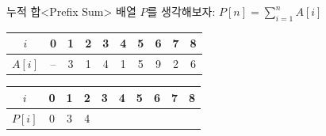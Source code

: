 \begin{frame}{누적 합}{<Prefix Sum>}
  배열 $P$를 생각해보자: $P[n] = \sum\limits_{i=1}^{n} A[i]$
  \vspace{4mm}
  \begin{center}
    \begin{tabular}{|c|c|c|c|c|c|c|c|c|c|}
      \hline
      \rowcolor{aloha-highlight}
      $i$    & 0 & 1 & 2 & 3 & 4 & 5 & 6 & 7 & 8 \\ \hline
      $A[i]$ & – & 3 & 1 & 4 & 1 & 5 & 9 & 2 & 6 \\ \hline
    \end{tabular}

    \vspace{2mm}
    \hspace{6mm}

    \vspace{2mm}
    \begin{tabular}{|c|c|c|c|c|c|c|c|c|c|}
      \hline
      \rowcolor{aloha-highlight}
      $i$    & 0 & 1 & 2 & 3 & 4 & 5 & 6 & 7 & 8 \\ \hline
      $P[i]$ & 0 & 3 & \cellcolor{aloha-accent!55}\color{white}4
             &   &   &   &   &   &   \\ \hline
    \end{tabular}
  \end{center}
\end{frame}

